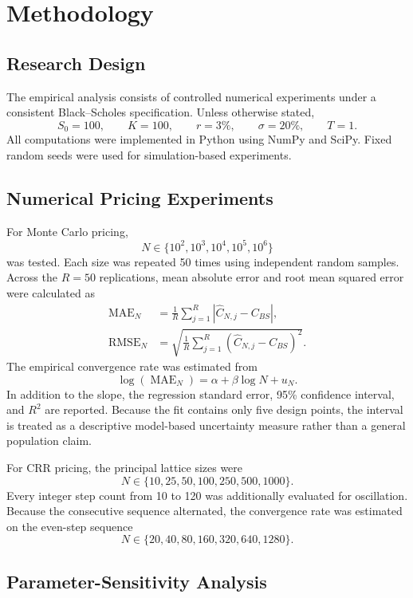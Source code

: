 \documentclass[11pt,a4paper]{article}
\begin{document}
\section{Methodology}

\subsection{Research Design}

The empirical analysis consists of controlled numerical experiments under a consistent Black--Scholes specification. Unless otherwise stated,
\[
S_0=100,\qquad K=100,\qquad r=3\%,\qquad \sigma=20\%,\qquad T=1.
\]
All computations were implemented in Python using NumPy and SciPy. Fixed random seeds were used for simulation-based experiments.

\subsection{Numerical Pricing Experiments}

For Monte Carlo pricing,
\[
N\in\{10^2,10^3,10^4,10^5,10^6\}
\]
was tested. Each size was repeated 50 times using independent random samples. Across the $R=50$ replications, mean absolute error and root mean squared error were calculated as
\begin{align}
\operatorname{MAE}_N&=\frac{1}{R}\sum_{j=1}^{R}\left|\widehat C_{N,j}-C_{BS}\right|,\\
\operatorname{RMSE}_N&=\sqrt{\frac{1}{R}\sum_{j=1}^{R}(\widehat C_{N,j}-C_{BS})^2}.
\end{align}
The empirical convergence rate was estimated from
\begin{equation}
    \log(\operatorname{MAE}_N)=\alpha+\beta\log N+u_N.
\end{equation}
In addition to the slope, the regression standard error, 95\% confidence interval, and $R^2$ are reported. Because the fit contains only five design points, the interval is treated as a descriptive model-based uncertainty measure rather than a general population claim.

For CRR pricing, the principal lattice sizes were
\[
N\in\{10,25,50,100,250,500,1000\}.
\]
Every integer step count from 10 to 120 was additionally evaluated for oscillation. Because the consecutive sequence alternated, the convergence rate was estimated on the even-step sequence
\[
N\in\{20,40,80,160,320,640,1280\}.
\]

\subsection{Parameter-Sensitivity Analysis}
\end{document}
